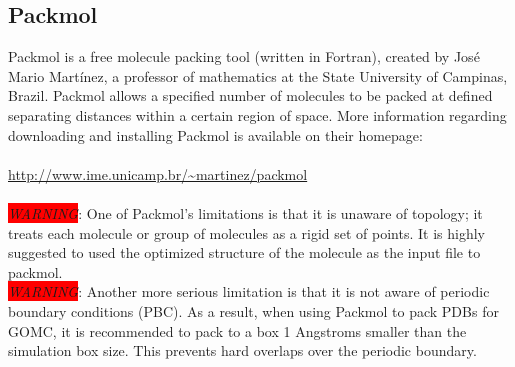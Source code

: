 \subsection{Packmol}
Packmol is a free molecule packing tool (written in Fortran), created by Jos\'e Mario Mart\'inez, a professor of mathematics at the State University of Campinas, Brazil.  Packmol allows a specified number of molecules to be packed at defined separating distances within a certain region of space.  More information regarding downloading and installing Packmol is available on their homepage:\\\\
\url{http://www.ime.unicamp.br/~martinez/packmol}\\\\

\textit{\colorbox{red}{WARNING}}: One of Packmol's limitations is that it is unaware of topology; it treats each molecule or group of molecules as a rigid set of points. It is highly suggested to used the optimized structure of the molecule as the input file to packmol.\\

\textit{\colorbox{red}{WARNING}}: Another more serious limitation is that it is not aware of periodic boundary conditions (PBC).  As a result, when using Packmol to pack PDBs for GOMC, it is recommended to pack to a box 1 Angstroms smaller than the simulation box size.  This prevents hard overlaps over the periodic boundary.\\\\


